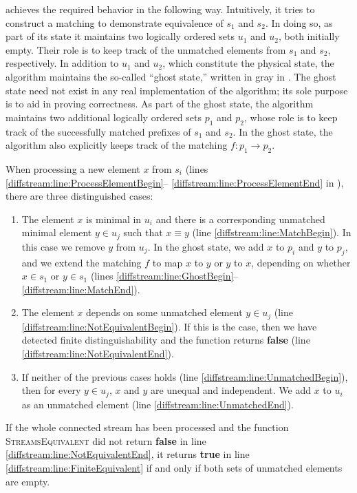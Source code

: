  achieves the required behavior in the following
way. Intuitively,
it tries to construct a matching to demonstrate equivalence of
$s_1$ and $s_2$. In doing so, as part of its state
it maintains two logically ordered sets
$u_1$ and $u_2$,
both initially empty. Their role is to keep track of the unmatched elements from
$s_1$ and $s_2$, respectively.
In addition to $u_1$ and $u_2$, which constitute the physical state, the
algorithm maintains the so-called ``ghost state,'' written in gray in
. The ghost state need not exist in any real
implementation of the algorithm; its sole purpose is to aid in proving
correctness. As part of the ghost state, the algorithm maintains two additional
logically ordered sets $p_1$ and $p_2$, whose role is to keep track of the
successfully matched prefixes of $s_1$ and $s_2$. In the ghost state, the
algorithm also explicitly
keeps track of the matching $f\colon p_1\to p_2$.

When processing a new element $x$ from $s_i$
(lines \ref{diffstream:line:ProcessElementBegin}--%
\ref{diffstream:line:ProcessElementEnd} in ), there are three
distinguished cases:
\begin{enumerate}
  \item The element $x$ is minimal in $u_i$ and there is a corresponding
    unmatched minimal element $y\in u_j$ such that $x \equiv y$ (line
    \ref{diffstream:line:MatchBegin}). In this case
    we remove $y$ from $u_j$. In the ghost state, we add $x$ to $p_i$ and $y$
    to $p_j$, and we extend the matching $f$ to map $x$ to $y$
    or $y$ to $x$, depending on whether $x\in s_1$ or $y\in s_1$ (lines \ref{diffstream:line:GhostBegin}--\ref{diffstream:line:MatchEnd}).
  \item The element $x$ depends on some unmatched element $y\in u_j$ (line
    \ref{diffstream:line:NotEquivalentBegin}).
    If this is the case, then we have detected finite distinguishability
    and the function returns \textbf{false} (line
    \ref{diffstream:line:NotEquivalentEnd}).
  \item If neither of the previous cases holds (line \ref{diffstream:line:UnmatchedBegin}),
    then for every $y\in u_j$, $x$ and $y$ are unequal and independent.
    We add $x$ to $u_i$ as an
    unmatched element (line \ref{diffstream:line:UnmatchedEnd}).
\end{enumerate}

If the whole connected stream has been processed and the function \textsc{StreamsEquivalent} did not return \textbf{false} in line \ref{diffstream:line:NotEquivalentEnd}, it returns \textbf{true} in line \ref{diffstream:line:FiniteEquivalent} if and only if both sets of
unmatched elements are empty.

